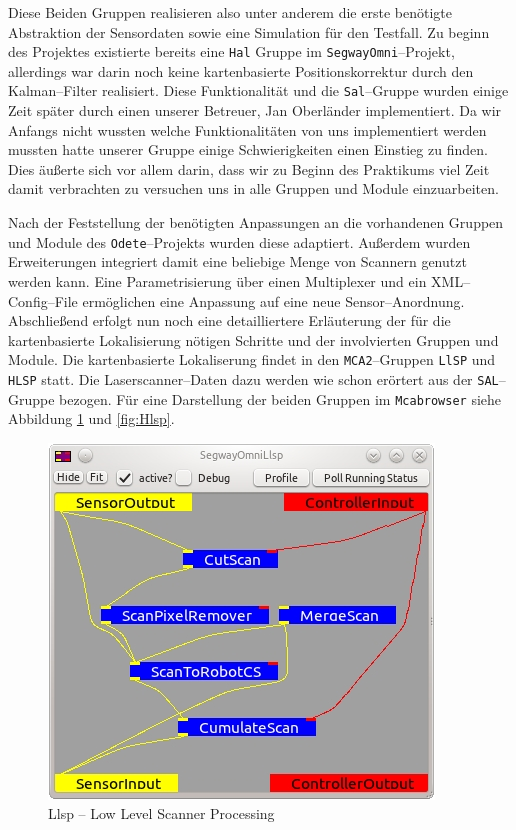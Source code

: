 Diese Beiden Gruppen realisieren also unter anderem die erste benötigte
 Abstraktion der Sensordaten sowie eine Simulation für den Testfall. Zu beginn
 des Projektes existierte bereits eine \lstinline{Hal} Gruppe im
 \lstinline{SegwayOmni}--Projekt, allerdings war darin noch keine kartenbasierte
 Positionskorrektur durch den Kalman--Filter realisiert. Diese Funktionalität und
 die \lstinline{Sal}--Gruppe wurden einige Zeit später durch einen unserer Betreuer,
 Jan Oberländer implementiert. Da wir Anfangs nicht wussten
 welche Funktionalitäten von uns implementiert werden mussten hatte unserer Gruppe einige Schwierigkeiten
 einen Einstieg zu finden. Dies äußerte sich vor allem darin, dass wir zu Beginn des Praktikums viel Zeit damit
 verbrachten zu versuchen uns in alle Gruppen und Module einzuarbeiten.

Nach der Feststellung der benötigten Anpassungen an die vorhandenen Gruppen und
 Module des \lstinline{Odete}--Projekts wurden diese adaptiert. Außerdem wurden
 Erweiterungen integriert damit eine beliebige Menge von Scannern genutzt werden
 kann.
 Eine Parametrisierung über einen Multiplexer und ein XML--Config--File
 ermöglichen eine Anpassung auf eine neue Sensor--Anordnung. Abschließend erfolgt
 nun noch eine detailliertere Erläuterung der für die kartenbasierte
 Lokalisierung nötigen Schritte und der involvierten Gruppen und Module. Die kartenbasierte Lokaliserung
 findet in den \lstinline{MCA2}--Gruppen \lstinline{LlSP} und \lstinline{HLSP}
 statt. Die Laserscanner--Daten dazu werden wie schon erörtert aus der
 \lstinline{SAL}--Gruppe bezogen.
 Für eine Darstellung der beiden Gruppen im \lstinline{Mcabrowser} siehe
 Abbildung \ref{fig:Llsp} und \ref{fig:Hlsp}.
 
\begin{figure}[h]
\center
\includegraphics[scale=0.7]{graphics/Llsp.jpg}
\caption{\label{fig:Llsp}Llsp -- Low Level Scanner Processing}
\end{figure}

